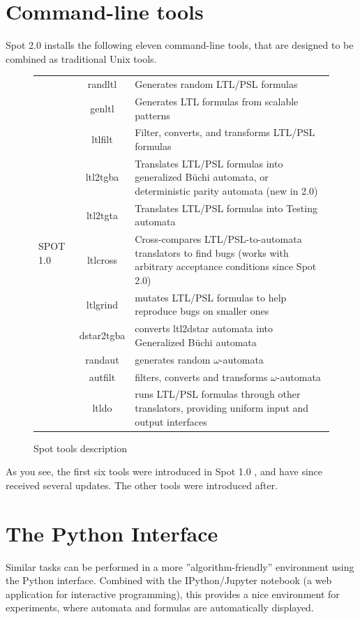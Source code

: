 \section{Command-line tools}
Spot 2.0 installs the following eleven command-line tools, that are designed to be combined as traditional
Unix tools.\\
\begin{figure}[H]
 \begin{tabular}{l c | m{8cm}}
  \multirow{13}{*}{SPOT 1.0}&randltl&Generates random LTL/PSL formulas\\
   &genltl&Generates LTL formulas from scalable patterns\\
   &ltlfilt&Filter, converts, and transforms LTL/PSL formulas\\
   &ltl2tgba&Translates LTL/PSL formulas into generalized Büchi automata\cite{7}, or deterministic parity
	     automata (new in 2.0)\\
   &ltl2tgta&Translates LTL/PSL formulas into Testing automata\cite{6}\\
   &ltlcross&Cross-compares LTL/PSL-to-automata translators to find bugs (works with arbitrary acceptance
	     conditions since Spot 2.0)\\
   \hline
   &ltlgrind&mutates LTL/PSL formulas to help reproduce bugs on smaller ones\\
   &dstar2tgba&converts ltl2dstar automata into Generalized Büchi automata\cite{5}\\
   &randaut&generates random $\omega$-automata\\
   &autfilt&filters, converts and transforms $\omega$-automata\\
   &ltldo&runs LTL/PSL formulas through other translators, providing uniform input and output interfaces\\
 \end{tabular}
 \caption{Spot tools description}
\end{figure}
As you see, the first six tools were introduced in Spot 1.0 \cite{1}, and have since received several updates. The other tools
were introduced after.

\section{The Python Interface}
Similar tasks can be performed in a more ''algorithm-friendly'' environment using the Python interface.
Combined with the IPython/Jupyter notebook \cite{4} (a web application for interactive programming), this
provides a nice environment for experiments, where automata and formulas are automatically displayed.

